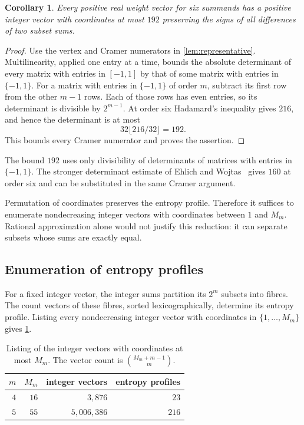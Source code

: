 \documentclass[11pt,a4paper]{article}
\numberwithin{equation}{section}
\newtheorem{corollary}[theorem]{Corollary}
\theoremstyle{remark}
\begin{document}
\begin{corollary}\label{cor:refinement}
Every positive real weight vector for six summands has a positive integer vector with coordinates at most $192$ preserving the signs of all differences of two subset sums.
\end{corollary}
\begin{proof}
Use the vertex and Cramer numerators in \cref{lem:representative}. Multilinearity, applied one entry at a time, bounds the absolute determinant of every matrix with entries in $[-1,1]$ by that of some matrix with entries in $\{-1,1\}$. For a matrix with entries in $\{-1,1\}$ of order $m$, subtract its first row from the other $m-1$ rows. Each of those rows has even entries, so its determinant is divisible by $2^{m-1}$. At order six Hadamard's inequality gives $216$, and hence the determinant is at most
\[
 32\lfloor216/32\rfloor=192.
\]
This bounds every Cramer numerator and proves the assertion.
\end{proof}

The bound $192$ uses only divisibility of determinants of matrices with entries in $\{-1,1\}$. The stronger determinant estimate of Ehlich and Wojtas~\cite{Ehlich,Wojtas} gives $160$ at order six and can be substituted in the same Cramer argument.

Permutation of coordinates preserves the entropy profile. Therefore it suffices to enumerate nondecreasing integer vectors with coordinates between $1$ and $M_m$. Rational approximation alone would not justify this reduction: it can separate subsets whose sums are exactly equal.

\subsection{Enumeration of entropy profiles}\label{sec:enumeration}

For a fixed integer vector, the integer sums partition its $2^m$ subsets into fibres. The count vectors of these fibres, sorted lexicographically, determine its entropy profile. Listing every nondecreasing integer vector with coordinates in $\{1,\ldots,M_m\}$ gives \cref{tab:profiles}.

\begin{table}[ht]
\centering
\begin{tabular}{rrrr}
\toprule
$m$ & $M_m$ & integer vectors & entropy profiles\\
\midrule
$4$ & $16$ & $3{,}876$ & $23$\\
$5$ & $55$ & $5{,}006{,}386$ & $216$\\
\bottomrule
\end{tabular}
\caption{Listing of the integer vectors with coordinates at most $M_m$. The vector count is $\binom{M_m+m-1}{m}$.}\label{tab:profiles}
\end{table}
\end{document}
